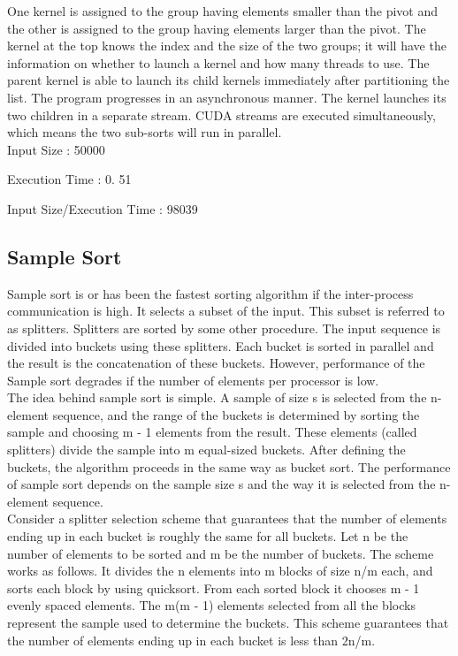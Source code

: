 \documentclass[conference]{IEEEtran}
\begin{document}
One kernel is assigned to the group having elements smaller than the pivot
and the other is assigned to the group having elements larger than the pivot. The kernel
at the top knows the index and the size of the two groups; it will have the information
on whether to launch a kernel and how many threads to use. The parent kernel is able to
launch its child kernels immediately after partitioning the list. The program progresses
in an asynchronous manner. The kernel launches its two children in a separate stream.
CUDA streams are executed simultaneously, which means the two sub-sorts will run
in parallel.\\

Input Size : 50000 

Execution Time : 0. 51

Input Size/Execution Time : 98039\\

\subsection{Sample Sort}
Sample sort is or has been the fastest sorting algorithm if the inter-process communication is high. It selects a subset of the input. This subset is referred to as splitters. Splitters are sorted by some other procedure. The input sequence is divided into buckets using these splitters. Each bucket is sorted in parallel and the result is the concatenation of these buckets. However, performance of the Sample sort degrades if the number of elements per processor is low.\\

The idea behind sample sort is simple. A sample of size s is selected from the n-element sequence, and the range of the buckets is determined by sorting the sample and choosing m - 1 elements from the result. These elements (called splitters) divide the sample into m equal-sized buckets. After defining the buckets, the algorithm proceeds in the same way as bucket sort. The performance of sample sort depends on the sample size s and the way it is selected from the n-element sequence.\\

Consider a splitter selection scheme that guarantees that the number of elements ending up in each bucket is roughly the same for all buckets. Let n be the number of elements to be sorted and m be the number of buckets. The scheme works as follows. It divides the n elements into m blocks of size n/m each, and sorts each block by using quicksort. From each sorted block it chooses m - 1 evenly spaced elements. The m(m - 1) elements selected from all the blocks represent the sample used to determine the buckets. This scheme guarantees that the number of elements ending up in each bucket is less than 2n/m.\\
\end{document}
